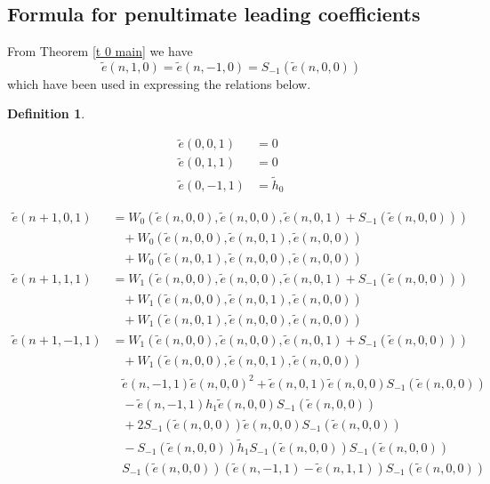 \documentclass[11pt, oneside]{article}   	%
\newtheorem{definition}{Definition}
\newcommand{\ti}{\tilde{h}}
\newcommand{\te}{\tilde{e}}
\begin{document}
\subsection{Formula for penultimate leading coefficients}

From Theorem \ref{t 0 main} we have 
\[
\te(n,1,0) = \te(n,-1,0) = S_{-1}( \te(n,0,0)) 
\]
which have been used in expressing the relations below.

\begin{definition} \label{d lc1 rec}

\begin{align*}
\te(0,0,1) &= 0\\ 
\te(0,1,1) &= 0 \\ 
\te(0,-1,1) &= \ti_0
\end{align*}

\begin{align}
\te(n+1,0,1) &= W_0(\te(n,0,0),\te(n,0,0), \te(n,0,1) + S_{-1}(\te(n,0,0)) ) \label{r0 1} \\ 
&\,\,\,\,\, + W_0(\te(n,0,0),\te(n,0,1), \te(n,0,0) ) \label{r0 2} \\
&\,\,\,\,\,+ W_0(\te(n,0,1),\te(n,0,0), \te(n,0,0) )  \label{r0 3} \\ 
\te(n+1,1,1) &= W_1(\te(n,0,0),\te(n,0,0), \te(n,0,1) + S_{-1}(\te(n,0,0)) ) \label{r1 1} \\ 
&\,\,\,\,\, + W_1(\te(n,0,0),\te(n,0,1), \te(n,0,0) ) \label{r1 2} \\
&\,\,\,\,\,+ W_1(\te(n,0,1),\te(n,0,0), \te(n,0,0) )  \label{r1 3} \\ 
\te(n+1,-1,1) &= W_1(\te(n,0,0),\te(n,0,0), \te(n,0,1) + S_{-1}(\te(n,0,0)) ) \label{d 1} \\ 
&\,\,\,\,\, + W_1(\te(n,0,0),\te(n,0,1), \te(n,0,0) ) \label{d 2} \\
&\,\,\,\,\, \te(n,-1,1)\te(n,0,0)^2+\te(n,0,1)\te(n,0,0)S_{-1}(\te(n,0,0)) \label{d 3} \\ 
&\,\,\,\,\, -\te(n,-1,1) h_1 \te(n,0,0)S_{-1}(\te(n,0,0)) \label{d 4} \\   
&\,\,\,\,\, +2S_{-1}(\te(n,0,0)) \te(n,0,0)S_{-1}(\te(n,0,0))  \label{d 5} \\ 
&\,\,\,\,\,-S_{-1}(\te(n,0,0)) \ti_1 S_{-1}(\te(n,0,0)) S_{-1}(\te(n,0,0))  \label{d 6} \\ 
&\,\,\,\,\, S_{-1}(\te(n,0,0)) (\te(n,-1,1)-\te(n,1,1)  )S_{-1}(\te(n,0,0))  \label{d 7} 
\end{align}
\end{definition}
\end{document}
